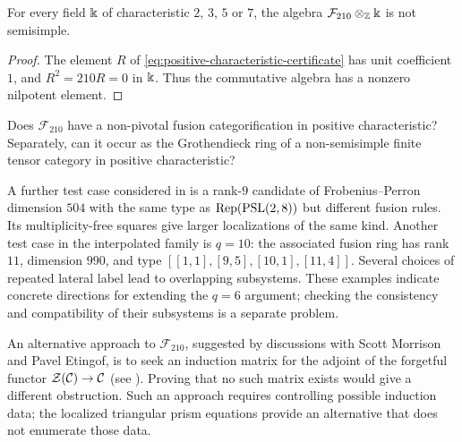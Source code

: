 \documentclass{amsart}
\begin{document}
\begin{proposition}\label{prop:F210-nonsemisimple}
For every field $\Bbbk$ of characteristic $2$, $3$, $5$ or $7$,
the algebra $\mathcal F_{210}\otimes_{\mathbb Z}\Bbbk$ is not semisimple.
\end{proposition}
\begin{proof}
The element $R$ of \eqref{eq:positive-characteristic-certificate} has unit
coefficient $1$, and $R^2=210R=0$ in $\Bbbk$. Thus the commutative algebra
has a nonzero nilpotent element.
\end{proof}


\begin{question} %
Does $\mathcal F_{210}$ have a non-pivotal fusion categorification in positive characteristic? Separately, can it occur as the Grothendieck ring of a non-semisimple finite tensor category in positive characteristic?
\end{question}

\begin{remark}\label{rk:504}\label{rk:ind}
A further test case considered in \cite[Question~1.14 and \S6.5]{ABDP} is a rank-$9$ candidate of Frobenius--Perron
dimension $504$ with the same type as $\mathrm{Rep}(\mathrm{PSL}(2,8))$ but different
fusion rules. Its multiplicity-free squares give larger localizations of
the same kind. Another test case in the interpolated family is $q=10$:
the associated fusion ring has rank $11$, dimension $990$, and type
$[[1,1],[9,5],[10,1],[11,4]]$. Several choices of repeated lateral label
lead to overlapping subsystems. These examples indicate concrete directions
for extending the $q=6$ argument; checking the consistency and compatibility
of their subsystems is a separate problem.

An alternative approach to $\mathcal F_{210}$, suggested by discussions
with Scott Morrison and Pavel Etingof, is to seek an induction matrix for
the adjoint of the forgetful functor
$\mathcal Z(\mathcal{C})\to\mathcal{C}$ (see \cite{ABDP,MW17}).
Proving that no such matrix exists would give a different obstruction.
Such an approach requires controlling possible induction data; the localized triangular prism
equations provide an alternative that does not enumerate those data.
\end{remark}
\end{document}
